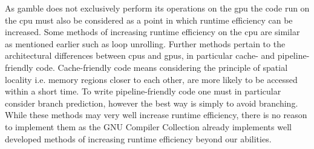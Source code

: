 As \gls{gamble} does not exclusively perform its operations on the \acrshort{gpu} the code run on the \acrshort{cpu} must also be considered as a point in which runtime efficiency can be increased.
Some methods of increasing runtime efficiency on the \acrshort{cpu} are similar as mentioned earlier such as loop unrolling.
Further methods pertain to the architectural differences between \acrshort{cpu}s and \acrshort{gpu}s, in particular cache- and pipeline-friendly code.
Cache-friendly code means considering the principle of spatial locality i.e. memory regions closer to each other, are more likely to be accessed within a short time.
To write pipeline-friendly code one must in particular consider branch prediction, however the best way is simply to avoid branching. \citep{CCodeOpt}
While these methods may very well increase runtime efficiency, there is no reason to implement them as the GNU Compiler Collection already implements well developed methods of increasing runtime efficiency beyond our abilities.